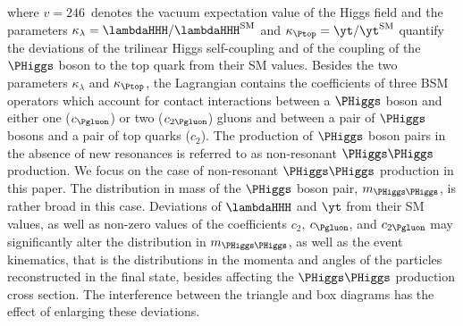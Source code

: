 where $v = 246$~\GeV denotes the vacuum expectation value of the Higgs field
and the parameters $\kappa_{\lambda} = \lambdaHHH/\lambdaHHH^{\textrm{SM}}$ and $\kappa_{\Ptop} = \yt/\yt^{\textrm{SM}}$ 
quantify the deviations of the trilinear Higgs self-coupling and of the coupling of the $\PHiggs$ boson to the top quark from their SM values.
Besides the two parameters $\kappa_{\lambda}$ and $\kappa_{\Ptop}$,
the Lagrangian contains the coefficients of three BSM operators which account for contact interactions 
between a $\PHiggs$ boson and either one ($c_{\Pgluon}$) or two ($c_{2\Pgluon}$) gluons
and between a pair of $\PHiggs$ bosons and a pair of top quarks ($c_{2}$).
The production of $\PHiggs$ boson pairs in the absence of new resonances is referred to as non-resonant $\PHiggs\PHiggs$ production.
We focus on the case of non-resonant $\PHiggs\PHiggs$ production in this paper.
The distribution in mass of the $\PHiggs$ boson pair, $m_{\PHiggs\PHiggs}$, is rather broad in this case.
Deviations of $\lambdaHHH$ and $\yt$ from their SM values,
as well as non-zero values of the coefficients $c_{2}$, $c_{\Pgluon}$, and $c_{2\Pgluon}$
may significantly alter the distribution in $m_{\PHiggs\PHiggs}$,
as well as the event kinematics,
that is the distributions in the momenta and angles of the particles reconstructed in the final state,
besides affecting the $\PHiggs\PHiggs$ production cross section.
The interference between the triangle and box diagrams has the effect of enlarging these deviations.

